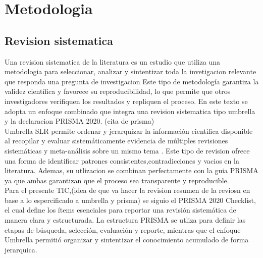 \chapter{Metodologia}
\section{Revision sistematica}
Una revision sistematica de la literatura es un estudio 
que utiliza una metodologia para seleccionar, analizar y 
sintentizar toda la invetigacion relevante que responda una pregunta de investigacion 
Este tipo de metodología garantiza la validez científica y favorece su reproducibilidad, lo que permite que otros investigadores verifiquen los resultados 
y repliquen el proceso. En este texto se adopta un enfoque combinado que integra una revision sistematica
tipo umbrella \cite{peffers2008design} y la declaracion PRISMA 2020. (cita de prisma)\\
Umbrella SLR permite ordenar y jerarquizar la información científica disponible al recopilar y evaluar sistemáticamente evidencia de múltiples revisiones sistemáticas y 
meta-análisis sobre un mismo tema \cite{Papatheodorou2019}. Este tipo de revision ofrece una forma de identificar patrones consistentes,contradicciones y vacios en la literatura. 
Ademas, su utlizacion se combinan perfectamente con la guia PRISMA ya que ambas garantizan que el proceso sea transparente y reproducible.\\
Para el presente TIC,(idea de que va hacer la revision resumen de la reviosn en base a lo espercificado a umbrella y prisma) se siguio el PRISMA 2020 Checklist, el cual define los ítems esenciales para reportar una revisión sistemática de manera clara y estructurada.
La estructura PRISMA se utliza para definir las etapas de búsqueda, selección, evaluación y reporte, mientras que el enfoque Umbrella permitió organizar y sintentizar el conocimiento acumulado de forma jerarquica.
